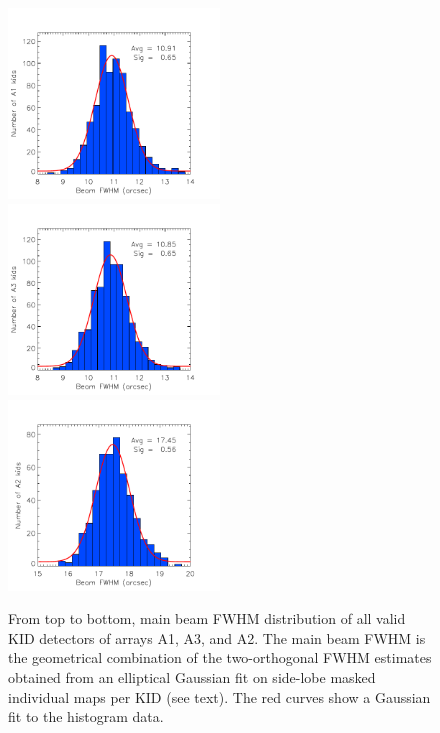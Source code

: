 \begin{figure}[h]
  \centering
  \includegraphics[clip=true,width=0.5\textwidth]{../../../Paper_NIKA2_Technical/plot_histo_A1_fwhm_20170424s123.pdf}
  \includegraphics[clip=true,width=0.5\textwidth]{../../../Paper_NIKA2_Technical/plot_histo_A3_fwhm_20170424s123.pdf}
  \includegraphics[clip=true,width=0.5\textwidth]{../../../Paper_NIKA2_Technical/plot_histo_A2_fwhm_20170424s123.pdf}
  
\caption[Main beam FWHM distribution across the array]{From top to bottom, main beam FWHM distribution of all valid KID detectors of arrays A1, A3, and A2. The main beam FWHM is the geometrical combination of the two-orthogonal FWHM estimates obtained from an elliptical Gaussian fit on side-lobe masked individual maps per KID (see text). The red curves show a Gaussian fit to the histogram data.}
  \label{fig:focalplane_histo}
\end{figure}


